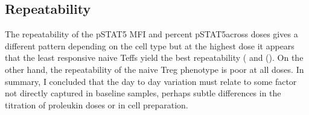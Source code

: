 %
%



\subsection{Repeatability} 

The repeatability of the pSTAT5 MFI and percent pSTAT5\positive across doses gives a different pattern depending on the cell type
but at the highest dose it appears that the least responsive naive \glspl{Teff} yield the best repeatability ( and ().
On the other hand, the repeatability of the naive \gls{Treg} phenotype is poor at all doses. 
In summary, I concluded that the day to day variation must relate to some factor not directly captured in baseline samples, perhaps subtle differences in the titration of proleukin doses or in cell preparation.

